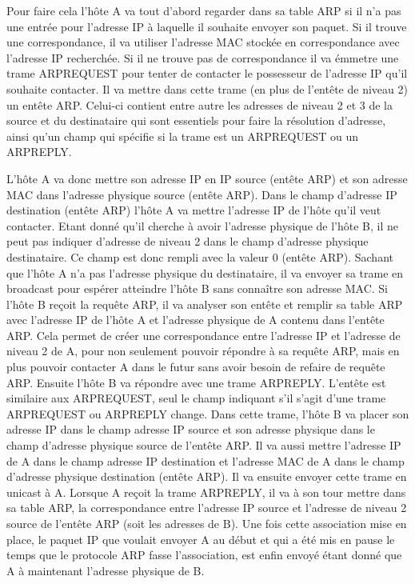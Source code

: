 Pour faire cela l'hôte A va tout d'abord regarder dans sa table ARP si il n'a
pas une entrée pour l'adresse IP à laquelle il souhaite envoyer son paquet. Si
il trouve une correspondance, il va utiliser l'adresse MAC stockée en
correspondance avec l'adresse IP recherchée.  Si il ne trouve pas de
correspondance il va émmetre une trame ARPREQUEST pour tenter de contacter le
possesseur de l'adresse IP qu'il souhaite contacter. Il va mettre dans cette
trame (en plus de l'entête de niveau 2) un entête ARP. Celui-ci contient entre
autre les adresses de niveau 2 et 3 de la source et du destinataire qui sont
essentiels pour faire la résolution d'adresse, ainsi qu'un champ qui spécifie
si la trame est un ARPREQUEST ou un ARPREPLY. 

\smallbreak
L'hôte A va donc mettre son
adresse IP en IP source (entête ARP) et son adresse MAC dans l'adresse physique
source (entête ARP). Dans le champ d'adresse IP destination (entête ARP) l'hôte
A va mettre l'adresse IP de l'hôte qu'il veut contacter. Etant donné qu'il
cherche à avoir l'adresse physique de l'hôte B, il ne peut pas indiquer
d'adresse de niveau 2 dans le champ d'adresse physique destinataire. Ce champ
est donc rempli avec la valeur 0 (entête ARP).  Sachant que l'hôte A n'a pas
l'adresse physique du destinataire, il va envoyer sa trame en broadcast pour
espérer atteindre l'hôte B sans connaître son adresse MAC. 
\smallbreak
Si l'hôte B reçoit
la requête ARP, il va analyser son entête et remplir sa table ARP avec
l'adresse IP de l'hôte A et l'adresse physique de A contenu dans l'entête ARP.
Cela permet de créer une correspondance entre l'adresse IP et l'adresse de
niveau 2 de A, pour non seulement pouvoir répondre à sa requête ARP, mais en
plus pouvoir contacter A dans le futur sans avoir besoin de refaire de requête
ARP. Ensuite l'hôte B va répondre avec une trame ARPREPLY. L'entête est
similaire aux ARPREQUEST, seul le champ indiquant s'il s'agit d'une trame
ARPREQUEST ou ARPREPLY change. Dans cette trame, l'hôte B va placer son adresse
IP dans le champ adresse IP source et son adresse physique dans le champ
d'adresse physique source de l'entête ARP. Il va aussi mettre l'adresse IP de A
dans le champ adresse IP destination et l'adresse MAC de A dans le champ
d'adresse physique destination (entête ARP).  Il va ensuite envoyer cette trame
en unicast à A.  Lorsque A reçoit la trame ARPREPLY, il va à son tour mettre
dans sa table ARP, la correspondance entre l'adresse IP source et l'adresse de
niveau 2 source de l'entête ARP (soit les adresses de B).  Une fois cette
association mise en place, le paquet IP que voulait envoyer A au début et qui a
été mis en pause le temps que le protocole ARP fasse l'association, est enfin
envoyé étant donné que A à maintenant l'adresse physique de B.



